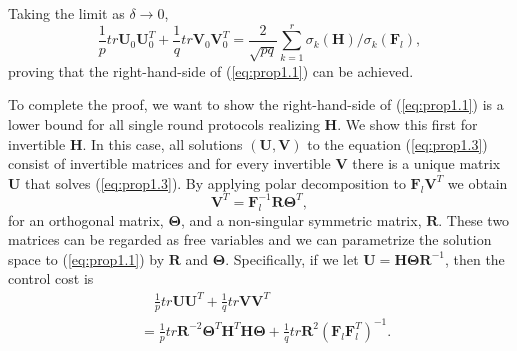 \documentclass[12pt,onecolumn,draftcls]{IEEEtran}
\begin{document}
Taking the limit as $\delta\rightarrow 0$,
\begin{equation}
\frac{1}{p}tr\mathbf{U}_0\mathbf{U}_0^T + \frac{1}{q}tr \mathbf{V}_0\mathbf{V}_0^T
= \frac{2}{\sqrt{pq}} \sum_{k=1}^{r} \sigma_{k}(\mathbf{H})/\sigma_{k}(\mathbf{F}_l),
\label{eq:5.12}
\end{equation}
proving that the right-hand-side of (\ref{eq:prop1.1}) can be achieved.

To complete the proof, we want to show  the right-hand-side of (\ref{eq:prop1.1}) is a lower bound for all
single round protocols realizing $\mathbf{H}$.   We show this first for invertible ${\mathbf H}$.  In this case, all solutions
$(\mathbf{U},\mathbf{V})$ to the equation (\ref{eq:prop1.3})
consist of invertible matrices and for every invertible $\mathbf{V}$ there is a unique matrix ${\mathbf U}$ that solves (\ref{eq:prop1.3}).
By applying polar decomposition to $\mathbf{F}_l\mathbf{V}^T$ we obtain
\begin{equation}
\mathbf{V}^T =\mathbf{F}_l^{-1}\mathbf{R}\mathbf{\Theta}^T,
\end{equation} 
for an orthogonal matrix, $\mathbf{\Theta}$, and a non-singular symmetric matrix, $\mathbf{R}$.
These two matrices can be regarded as free variables and we can parametrize the solution space
to (\ref{eq:prop1.1}) by $\mathbf{R}$ and $\mathbf{\Theta}$.
Specifically, if we let $\mathbf{U}=\mathbf{H}\mathbf{\Theta}\mathbf{R}^{-1}$, then the control cost is
\begin{align}
&\quad \frac{1}{p}tr \mathbf{U} \mathbf{U}^T +
\frac{1}{q} tr \mathbf{V} \mathbf{V}^T \nonumber \\
&=
\frac{1}{p} tr \mathbf{R}^{-2} \mathbf{\Theta}^T \mathbf{H}^T \mathbf{H} \mathbf{\Theta}
+ \frac{1}{q} tr \mathbf{R}^2 (\mathbf{F}_l\mathbf{F}_l^T)^{-1}.
\end{align}
\end{document}
